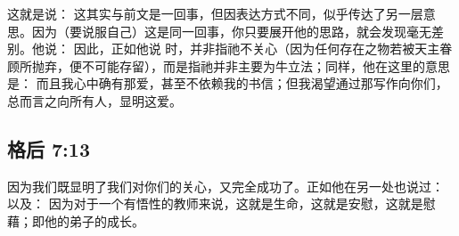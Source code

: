 \par

这就是说： 这其实与前文是一回事，但因表达方式不同，似乎传达了另一层意思。因为（要说服自己）这是同一回事，你只要展开他的思路，就会发现毫无差别。他说： 因此，正如他说   时，并非指祂不关心（因为任何存在之物若被天主眷顾所抛弃，便不可能存留），而是指祂并非主要为牛立法；同样，他在这里的意思是： 而且我心中确有那爱，甚至不依赖我的书信；但我渴望通过那写作向你们，总而言之向所有人，显明这爱。\par


\subsection{格后 7:13}

\par

因为我们既显明了我们对你们的关心，又完全成功了。正如他在另一处也说过：  以及：  因为对于一个有悟性的教师来说，这就是生命，这就是安慰，这就是慰藉；即他的弟子的成长。\par

